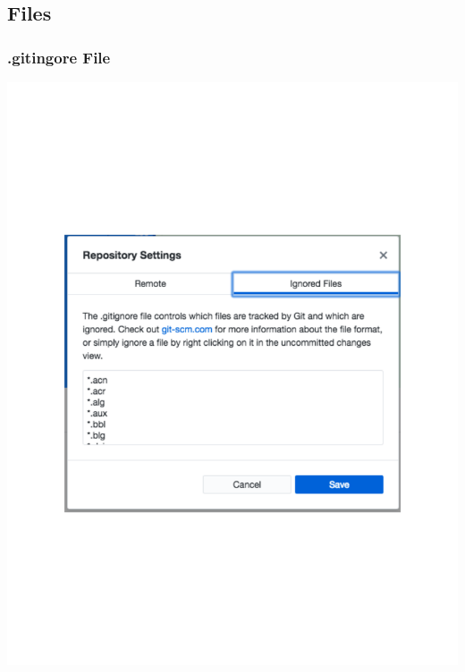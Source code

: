 \documentclass[]{beamer}
\begin{document}
\subsection{Files}
\begin{frame}[t]\frametitle{.gitingore File}
\centering
\includegraphics[scale = 0.49, trim={1.06in 2.83in 1.05in 2.84in},clip]{figures/gitignore_image.pdf}
\end{frame}
\end{document}
